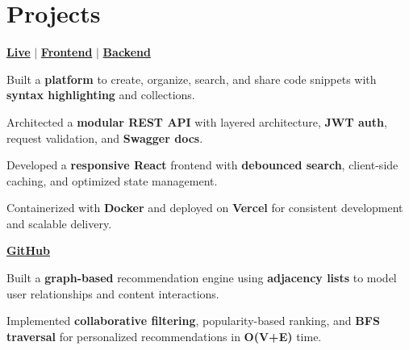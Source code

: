 \documentclass[]{deedy-resume-openfont}
\renewcommand{\sectionsep}{\vspace{8pt}}
\begin{document}
\begin{minipage}[t]{0.66\textwidth}
\begin{tightemize}
\end{tightemize}
\sectionsep


\section{Projects}
\href{https://snippetvault-v1.vercel.app/}{\bf Live}
\;$|$\; \href{https://github.com/deeplukhi/Snippet-Manager-Frontend}{\bf Frontend}
\;$|$\; \href{https://github.com/deeplukhi/Snippet-Manager-Backend}{\bf Backend}
\vspace{2pt}
\begin{tightemize}
  \item Built a \textbf{platform} to create, organize, search, and share code snippets with \textbf{syntax highlighting} and collections.
  \item Architected a \textbf{modular REST API} with layered architecture, \textbf{JWT auth}, request validation, and \textbf{Swagger docs}.
  \item Developed a \textbf{responsive React} frontend with \textbf{debounced search}, client-side caching, and optimized state management.
  \item Containerized with \textbf{Docker} and deployed on \textbf{Vercel} for consistent development and scalable delivery.
\end{tightemize}
\sectionsep

\href{https://github.com/deeplukhi/Social-Recommendation-Engine}{\bf GitHub}
\vspace{2pt}
\begin{tightemize}
  \item Built a \textbf{graph-based} recommendation engine using \textbf{adjacency lists} to model user relationships and content interactions.
  \item Implemented \textbf{collaborative filtering}, popularity-based ranking, and \textbf{BFS traversal} for personalized recommendations in \textbf{O(V+E)} time.
\end{tightemize}

\end{minipage}
\end{document}
